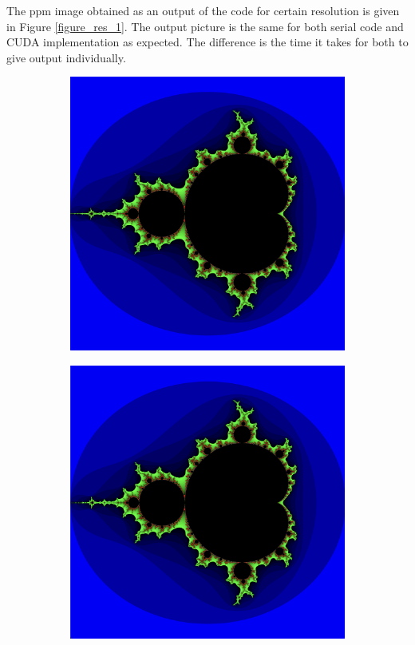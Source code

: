 \documentclass{article}
\begin{document}
\clearpage

The ppm image obtained as an output of the code for certain resolution is given in Figure \ref{figure_res_1}. The output picture is the same for both serial code and CUDA implementation as expected. The difference is the time it takes for both to give output individually. 

\begin{figure}[hbt!]
\centering
\begin{subfigure}{0.42\textwidth}
    \includegraphics[width=\textwidth]{Figures/serial_4096_4096.png}
\end{subfigure}
\hfill
\begin{subfigure}{0.42\textwidth}
    \includegraphics[width=\textwidth]{Figures/paralell_4096_4096.png}

\end{subfigure}
\end{figure}
\end{document}

